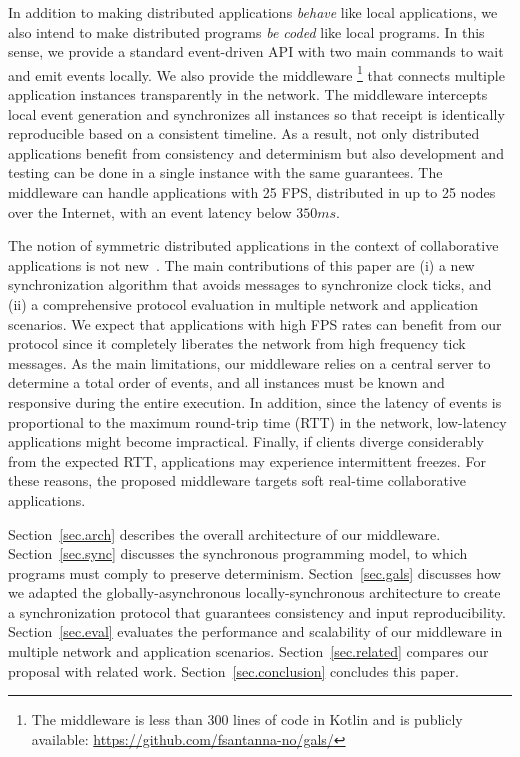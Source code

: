 \documentclass[sigplan,screen]{acmart}
\begin{document}
In addition to making distributed applications \emph{behave} like local
applications, we also intend to make distributed programs \emph{be coded} like
local programs.
In this sense, we provide a standard event-driven API with two main commands
to wait and emit events locally.
We also provide the middleware%
\footnote{The middleware is less than 300 lines of code in Kotlin and is
publicly available: \url{https://github.com/fsantanna-no/gals/}}
that connects multiple application instances transparently in the network.
The middleware intercepts local event generation and synchronizes all instances
so that receipt is identically reproducible based on a consistent timeline.
As a result, not only distributed applications benefit from consistency and
determinism but also development and testing can be done in a single instance
with the same guarantees.
The middleware can handle applications with 25 FPS, distributed in up to 25
nodes over the Internet, with an event latency below $350ms$.

The notion of symmetric distributed applications in the context of
collaborative applications is not new~\cite{tbag,croquet,mars}.
The main contributions of this paper are (i) a new synchronization algorithm
that avoids messages to synchronize clock ticks, and (ii) a comprehensive
protocol evaluation in multiple network and application scenarios.
We expect that applications with high FPS rates can benefit from our protocol
since it completely liberates the network from high frequency tick messages.
%
As the main limitations, our middleware relies on a central server to determine
a total order of events, and all instances must be known and responsive during
the entire execution.
In addition, since the latency of events is proportional to the maximum
round-trip time (RTT) in the network, low-latency applications might become
impractical.
Finally, if clients diverge considerably from the expected RTT, applications
may experience intermittent freezes.
For these reasons, the proposed middleware targets soft real-time collaborative
applications.

Section~\ref{sec.arch} describes the overall architecture of our middleware.
Section~\ref{sec.sync} discusses the synchronous programming model, to which
programs must comply to preserve determinism.
Section~\ref{sec.gals} discusses how we adapted the globally-asynchronous
locally-synchronous architecture to create a synchronization protocol that
guarantees consistency and input reproducibility.
Section~\ref{sec.eval} evaluates the performance and scalability of our
middleware in multiple network and application scenarios.
Section~\ref{sec.related} compares our proposal with related work.
Section~\ref{sec.conclusion} concludes this paper.
\end{document}

